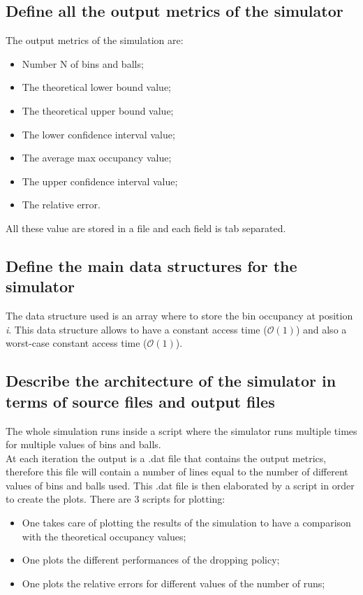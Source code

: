 \documentclass{report}
\begin{document}
{	\subsection{Define all the output metrics of the simulator}
			The output metrics of the simulation are:
			\begin{itemize}
				\item Number N of bins and balls;
				\item The theoretical lower bound value;
				\item The theoretical upper bound value;
				\item The lower confidence interval value;
				\item The average max occupancy value;
				\item The upper confidence interval value;
				\item The relative error.
			\end{itemize}
			All these value are stored in a file and each field is tab separated.
	
	\subsection{Define the main data structures for the simulator}
			The data structure used is an array where to store the bin occupancy at position \emph{i}. This data structure allows to have a constant access time ($\mathcal{O}(1)$) and also a worst-case constant access time ($\mathcal{O}(1)$).
			
	\subsection{Describe the architecture of the simulator in terms of source files and output files}
			The whole simulation runs inside a script where the simulator runs multiple times for multiple values of bins and balls. \\
			At each iteration the output is a .dat file that contains the output metrics, therefore this file will contain a number of lines equal to the number of different values of bins and balls used. This .dat file is then elaborated by a script in order to create the plots. There are 3 scripts for plotting:
			\begin{itemize}
				\item One takes care of plotting the results of the simulation to have a comparison with the theoretical occupancy values;
				\item One plots the different performances of the dropping policy;
				\item One plots the relative errors for different values of the number of runs;
			\end{itemize}
			
}
\end{document}
